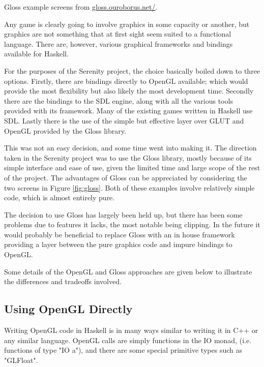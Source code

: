 \begin{marginfigure}
	\caption[Gloss example screens]{Gloss example screens from \url{gloss.ouroborus.net/}.}
	\label{fig:gloss}
\end{marginfigure}

Any game is clearly going to involve graphics in some capacity or another, but graphics are not something that at first sight seem suited to a functional language. There are, however, various graphical frameworks and bindings available for Haskell.

For the purposes of the Serenity project, the choice basically boiled down to three options. Firstly, there are bindings directly to OpenGL available; which would provide the most flexibility but also likely the most development time. Secondly there are the bindings to the SDL engine, along with all the various tools provided with its framework. Many of the existing games written in Haskell use SDL. Lastly there is the use of the simple but effective layer over GLUT and OpenGL provided by the Gloss library.

This was not an easy decision, and some time went into making it. The direction taken in the Serenity project was to use the Gloss library, mostly because of its simple interface and ease of use, given the limited time and large scope of the rest of the project. The advantages of Gloss can be appreciated by considering the two screens in Figure \ref{fig:gloss}. Both of these examples involve relatively simple code, which is almost entirely pure.

The decision to use Gloss has largely been held up, but there has been some problems due to features it lacks, the most notable being clipping. In the future it would probably be beneficial to replace Gloss with an in house framework providing a layer between the pure graphics code and impure bindings to OpenGL.

Some details of the OpenGL and Gloss approaches are given below to illustrate the differences and tradeoffs involved.

\subsection{Using OpenGL Directly}

Writing OpenGL code in Haskell is in many ways similar to writing it in C++ or any similar language. OpenGL calls are simply functions in the IO monad, (i.e. functions of type "IO a"), and there are some special primitive types such as "GLFloat". 

